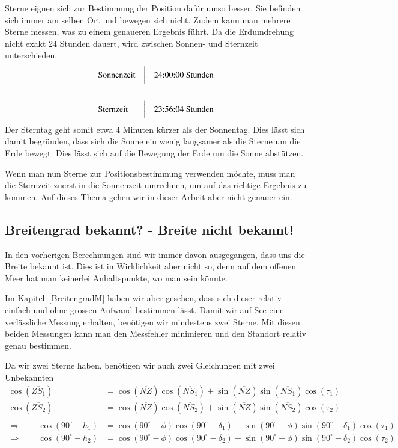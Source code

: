 \begin{refsection}
Sterne eignen sich zur Bestimmung der Position dafür umso besser. Sie befinden sich immer am selben Ort und bewegen sich nicht. Zudem kann man mehrere Sterne messen, was zu einem genaueren Ergebnis führt. Da die Erdumdrehung nicht exakt 24 Stunden dauert, wird zwischen Sonnen- und Sternzeit unterschieden.
\[
\begin{aligned}
&\text{Sonnenzeit}
&
&\text{\bigg \vert}
&
&\text{24:00:00 Stunden}
\\
\\
&\text{Sternzeit}
&
&\text{\bigg \vert}
&
&\text{23:56:04 Stunden}
\end{aligned}
\]
Der Sterntag geht somit etwa 4 Minuten kürzer als der Sonnentag. Dies lässt sich damit begründen, dass sich die Sonne ein wenig langsamer als die Sterne um die Erde bewegt. Dies lässt sich auf die Bewegung der Erde um die Sonne abstützen.

Wenn man nun Sterne zur Positionsbestimmung verwenden möchte, muss man die Sternzeit zuerst in die Sonnenzeit umrechnen, um auf das richtige Ergebnis zu kommen. Auf dieses Thema gehen wir in dieser Arbeit aber nicht genauer ein.


\subsection{Breitengrad bekannt? - Breite nicht bekannt!}

In den vorherigen Berechnungen sind wir immer davon ausgegangen, dass uns die Breite bekannt ist. Dies ist in Wirklichkeit aber nicht so, denn auf dem offenen Meer hat man keinerlei Anhaltspunkte, wo man sein könnte.

Im Kapitel~\ref{BreitengradM}  haben wir aber gesehen, dass sich dieser relativ einfach und ohne grossen Aufwand bestimmen lässt. Damit wir auf See eine verlässliche Messung erhalten, benötigen wir mindestens zwei Sterne. Mit diesen beiden Messungen kann man den Messfehler minimieren und den Standort relativ genau bestimmen.

Da wir zwei Sterne haben, benötigen wir auch zwei Gleichungen mit zwei Unbekannten
\begin{align*}
\cos(\overline{ZS_1}) &= \cos(\overline{NZ}) \cos(\overline{NS_1}) + \sin(\overline{NZ}) \sin(\overline{NS_1}) \cos(\tau_1) \\
\cos(\overline{ZS_2}) &= \cos(\overline{NZ}) \cos(\overline{NS_2}) + \sin(\overline{NZ}) \sin(\overline{NS_2}) \cos(\tau_2) \\
\\
\Rightarrow \quad \quad
\cos(90^{\circ} - h_1) &= \cos(90^{\circ} - \phi) \cos(90^{\circ} - \delta_1) + \sin(90^{\circ} - \phi)\sin(90^{\circ} - \delta_1) \cos(\tau_1) \\
\Rightarrow \quad \quad
\cos(90^{\circ} - h_2) &= \cos(90^{\circ} - \phi) \cos(90^{\circ} - \delta_2) + \sin(90^{\circ} - \phi)\sin(90^{\circ} - \delta_2) \cos(\tau_2)
\end{align*}


\end{refsection}
